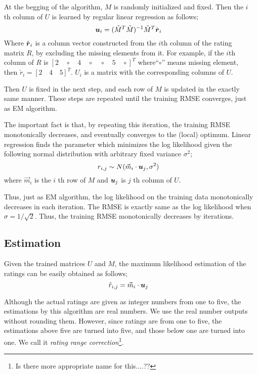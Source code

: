 \documentclass{article}
\begin{document}
At the begging of the algorithm, $M$ is randomly initialized and fixed. Then the $i$th column of $U$ is learned by regular linear regression as follows;
\begin{equation}
\mbox{\boldmath $u$}_i=(\check{M}^T\check{M})^{-1}\check{M}^T \check{\mbox{\boldmath $r$}}_i
\end{equation}
Where $\check{\mbox{\boldmath $r$}}_i$ is a column vector constructed from the $i$th column of the rating matrix $R$, by excluding the missing elements from it. For example, if the $i$th column of $R$ is $[2 \quad \circ \quad 4 \quad \circ \quad \circ \quad 5 \quad \circ]^T$ where``$\circ$'' means missing element, then $\check{r}_i = [2 \quad 4 \quad 5]^T$. $U_i$ is a matrix with the corresponding columns of $U$.

Then $U$ is fixed in the next step, and each row of $M$ is updated in the exactly same manner. These steps are repeated until the training RMSE converges, just as EM algorithm. 

The important fact is that, by repeating this iteration, the training RMSE monotonically decreases, and eventually converges to the (local) optimum. Linear regression finds the parameter which minimizes the log likelihood given the following normal distribution with arbitrary fixed variance $\sigma^2$;
\begin{equation}
r_{i,j}\sim N(\vec{m}_i \cdot {\mbox{\boldmath $u$}}_j, \sigma^2)
\end{equation}
where $\vec{m}_i$ is the $i$ th row of $M$ and ${\mbox{\boldmath $u$}}_j$ is $j$ th column of $U$.

Thus, just as EM algorithm, the log likelihood on the training data monotonically decreases in each iteration. The RMSE is exactly same as the log likelihood when $\sigma = 1/\sqrt{2}$. Thus, the training RMSE monotonically decreases by iterations.

\subsection{Estimation}
Given the trained matrices $U$ and $M$, the maximum likelihood estimation of the ratings can be easily obtained as follows;
\begin{equation}
\hat{r}_{i,j}=\vec{m}_i \cdot {\mbox{\boldmath $u$}}_j
\end{equation}

Although the actual ratings are given as integer numbers from one to five, the estimations by this algorithm are real numbers. We use the real number outputs without rounding them. However, since ratings are from one to five, the estimations above five are turned into five, and those below one are turned into one. We call it \textit{rating range correction}\footnote{Is there more appropriate name for this....??}.
\end{document}
